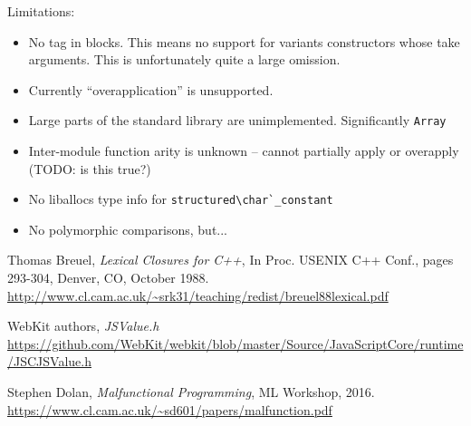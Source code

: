 \documentclass[12pt,a4paper,twoside,openright]{report}
\begin{document}
Limitations:

\begin{itemize}
  \item No tag in blocks. This means no support for variants constructors whose
    take arguments. This is unfortunately quite a large omission.
  \item Currently ``overapplication'' is unsupported.
  \item Large parts of the standard library are unimplemented. Significantly \lstinline!Array!
  \item Inter-module function arity is unknown -- cannot partially apply or overapply (TODO: is this true?)
  \item No liballocs type info for \lstinline!structured\char`_constant!
  \item No polymorphic comparisons, but...

\end{itemize}


\begin{thebibliography}{1}

  Thomas Breuel,
  \emph{Lexical Closures for C++},
  In Proc. USENIX C++ Conf., pages 293-304,
  Denver, CO, October 1988.  \\ \url{http://www.cl.cam.ac.uk/~srk31/teaching/redist/breuel88lexical.pdf}

  WebKit authors,
  \emph{JSValue.h}
  \url{https://github.com/WebKit/webkit/blob/master/Source/JavaScriptCore/runtime/JSCJSValue.h}

  Stephen Dolan,
  \emph{Malfunctional Programming},
  ML Workshop, 2016.  \\ \url{https://www.cl.cam.ac.uk/~sd601/papers/malfunction.pdf}

\end{thebibliography}

\appendix
\end{document}
